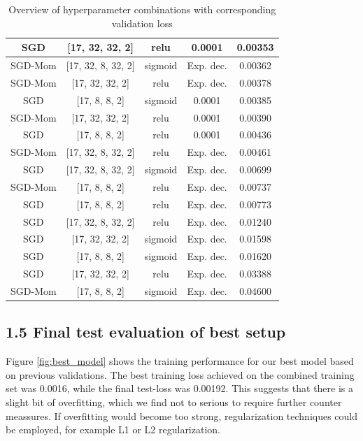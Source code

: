 \begin{table}[H]
\begin{tabular}{|c|c|c|c|c|}
        SGD & [17, 32, 32, 2] & relu & 0.0001 & 0.00353 \\ \hline
        SGD-Mom & [17, 32, 8, 32, 2] & sigmoid & Exp. dec. & 0.00362 \\ \hline
        SGD-Mom & [17, 32, 32, 2] & relu & Exp. dec. & 0.00378 \\ \hline
        SGD & [17, 8, 8, 2] & sigmoid & 0.0001 & 0.00385 \\ \hline
        SGD-Mom & [17, 32, 32, 2] & relu & 0.0001 & 0.00390 \\ \hline
        SGD & [17, 8, 8, 2] & relu & 0.0001 & 0.00436 \\ \hline
        SGD-Mom & [17, 32, 8, 32, 2] & relu & Exp. dec. & 0.00461 \\ \hline
        SGD & [17, 32, 8, 32, 2] & sigmoid & Exp. dec. & 0.00699 \\ \hline
        SGD-Mom & [17, 8, 8, 2] & relu & Exp. dec. & 0.00737 \\ \hline
        SGD & [17, 8, 8, 2] & relu & Exp. dec. & 0.00773 \\ \hline
        SGD & [17, 32, 8, 32, 2] & relu & Exp. dec. & 0.01240 \\ \hline
        SGD & [17, 32, 32, 2] & sigmoid & Exp. dec. & 0.01598 \\ \hline
        SGD & [17, 8, 8, 2] & sigmoid & Exp. dec. & 0.01620 \\ \hline
        SGD & [17, 32, 32, 2] & relu & Exp. dec. & 0.03388 \\ \hline
        SGD-Mom & [17, 8, 8, 2] & sigmoid & Exp. dec. & 0.04600 \\ \hline
    \end{tabular}  
    \caption{Overview of hyperparameter combinations with corresponding validation loss}
    \label{table:overview_table}
\end{table}

\subsection*{1.5 Final test evaluation of best setup}
Figure \ref{fig:best_model} shows the training performance for our best model based on previous validations. The best training loss achieved on the combined training set was 0.0016, while the final test-loss was 0.00192. This suggests that there is a slight bit of overfitting, which we find not to serious to require further counter meassures. If overfitting would become too strong, regularization techniques could be employed, for example L1 or L2 regularization.

